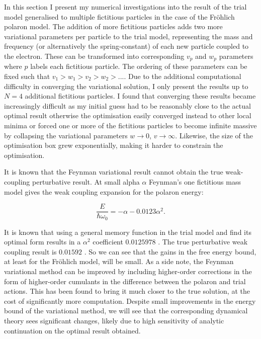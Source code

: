 In this section I present my numerical investigations into the result of the trial model generalised to multiple fictitious particles in the case of the Fr\"ohlich polaron model. The addition of more fictitious particles adds two more variational parameters per particle to the trial model, representing the mass and frequency (or alternatively the spring-constant) of each new particle coupled to the electron. These can be transformed into corresponding $v_p$ and $w_p$ parameters where $p$ labels each fictitious particle. The ordering of these parameters can be fixed such that $v_1 > w_1 > v_2 > w_2 > ...$. Due to the additional computational difficulty in converging the variational solution, I only present the results up to $N=4$ additional fictitious particles. I found that converging these results became increasingly difficult as my initial guess had to be reasonably close to the actual optimal result otherwise the optimisation easily converged instead to other local minima or forced one or more of the fictitious particles to become infinite massive by collapsing the variational parameters $w \to 0$, $v \to \infty$. Likewise, the size of the optimisation box grew exponentially, making it harder to constrain the optimisation.
\newline

It is known that the Feynman variational result cannot obtain the true weak-coupling perturbative result. At small alpha $\alpha$ Feynman's one fictitious mass model gives the weak coupling expansion for the polaron energy:

\begin{equation} \label{eqn:weakcoupling}
    \frac{E}{\hbar\omega_0} = -\alpha - 0.0123 \alpha^2.
\end{equation}

It is known that using a general memory function in the trial model and find its optimal form results in a $\alpha^2$ coefficient $0.0125978$ \cite{Rosenfelder2001}. The true perturbative weak coupling result is $0.01592$ \cite{Rosenfelder2001}. So we can see that the gains in the free energy bound, at least for the Fr\"ohlich model, will be small. As a side note, the Feynman variational method can be improved by including higher-order corrections in the form of higher-order cumulants in the difference between the polaron and trial actions. This has been found to bring it much closer to the true solution, at the cost of significantly more computation. Despite small improvements in the energy bound of the variational method, we will see that the corresponding dynamical theory sees significant changes, likely due to high sensitivity of analytic continuation on the optimal result obtained.

